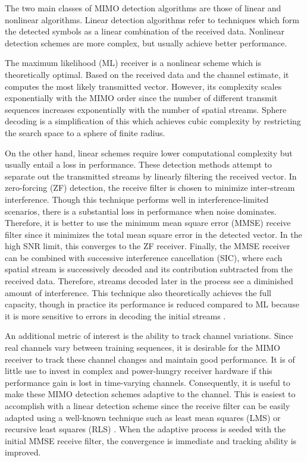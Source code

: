 \documentclass[journal]{IEEEtran}
\begin{document}
The two main classes of MIMO detection algorithms are those of linear and nonlinear algorithms. Linear detection algorithms refer to techniques which form the detected symbols as a linear combination of the received data. Nonlinear detection schemes are more complex, but usually achieve better performance. 

The maximum likelihood (ML) receiver is a nonlinear scheme which is theoretically optimal. Based on the received data and the channel estimate, it computes  the most likely transmitted vector. However, its complexity scales exponentially with the MIMO order since the number of different transmit sequences increases exponentially with the number of spatial streams. Sphere decoding is a simplification of this which achieves cubic complexity by restricting the search space to a sphere of finite radius. 

On the other hand, linear schemes require lower computational complexity but usually entail a loss in performance. These detection methods attempt to separate out the transmitted streams by linearly filtering the received vector. In zero-forcing (ZF) detection, the receive filter is chosen to minimize inter-stream interference. Though this technique performs well in interference-limited scenarios, there is a substantial loss in performance when noise dominates. Therefore, it is better to use the minimum mean square error (MMSE) receive filter since it minimizes the total mean square error in the detected vector. In the high SNR limit, this converges to the ZF receiver. Finally, the MMSE receiver can be combined with successive interference cancellation (SIC), where each spatial stream is successively decoded and its contribution subtracted from the received data. Therefore, streams decoded later in the process see a diminished amount of interference. This technique also theoretically achieves the full capacity, though in practice its performance is reduced compared to ML because it is more sensitive to errors in decoding the initial streams \cite{tse}. 

An additional metric of interest is the ability to track channel variations. Since real channels vary between training sequences, it is desirable for the MIMO receiver to track these channel changes and maintain good performance. It is of little use to invest in complex and power-hungry receiver hardware if this performance gain is lost in time-varying channels. Consequently, it is useful to make these MIMO detection schemes adaptive to the channel. This is easiest to accomplish with a linear detection scheme since the receive filter can be easily adapted using a well-known technique such as least mean squares (LMS) or recursive least squares (RLS) \cite{digital_bf, bf_notes}. When the adaptive process is seeded with the initial MMSE receive filter, the convergence is immediate and tracking ability is improved.
\end{document}
